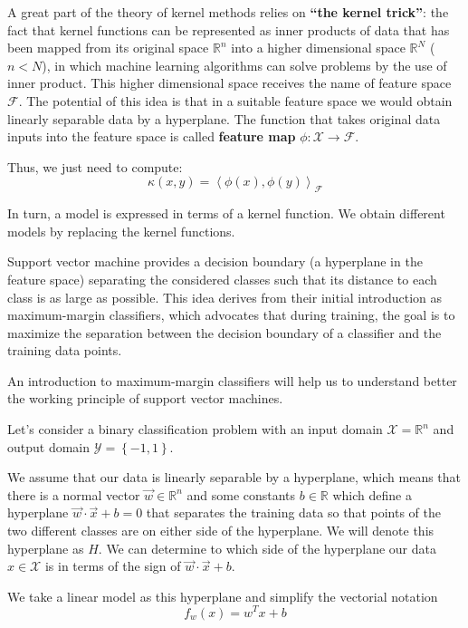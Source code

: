  
 A great part of the theory of kernel methods relies on \textbf{``the kernel trick''}: the fact that kernel functions can be represented as inner products of data that has been mapped from its original space $\mathbb{R}^n$ into a higher dimensional space $\mathbb{R}^N$ ($n<N$), in which machine learning algorithms can solve problems by the use of inner product. This higher dimensional space receives the name of feature space $\mathcal{F}$. The potential of this idea is that in a suitable feature space we would obtain linearly separable data by a hyperplane. The function that takes original data inputs into the feature space is called \textbf{feature map} $\phi : \mathcal{X} \longrightarrow \mathcal{F} $.

 Thus, we just need to compute: 
 \begin{equation}
     \kappa(x, y) = \left< \phi(x), \phi(y) \right>_{\mathcal{F}}
 \end{equation}

 In turn, a model is expressed in terms of a kernel function. We obtain different models by replacing the kernel functions. 

Support vector machine provides a decision boundary (a hyperplane in the feature space) separating the considered classes such that its distance to each class is as large as possible. This idea derives from their initial introduction as maximum-margin classifiers, which advocates that during training, the goal is to maximize the separation between the decision boundary of a classifier and the training data points.

An introduction to maximum-margin classifiers will help us to understand better the working principle of support vector machines.

Let's consider a binary classification problem with an input domain $\mathcal{X} = \mathbb{R}^n$ and output domain $\mathcal{Y}=\left\lbrace -1, 1\right\rbrace$. 

We assume that our data is linearly separable by a hyperplane, which means that there is a normal vector $\vec{w} \in \mathbb{R}^n$ and some constants $b \in \mathbb{R}$ which define a hyperplane $\vec{w}\cdot \vec{x} +b =0$ that separates the training data so that points of the two different classes are on either side of the hyperplane. We will denote this hyperplane as $H$. We can determine to which side of the hyperplane our data $x \in \mathcal{X}$ is in terms of the sign of $\vec{w}\cdot \vec{x} +b$. 

We take a linear model as this hyperplane and simplify the vectorial notation
$$f_{w}(x) = w^T x + b$$

